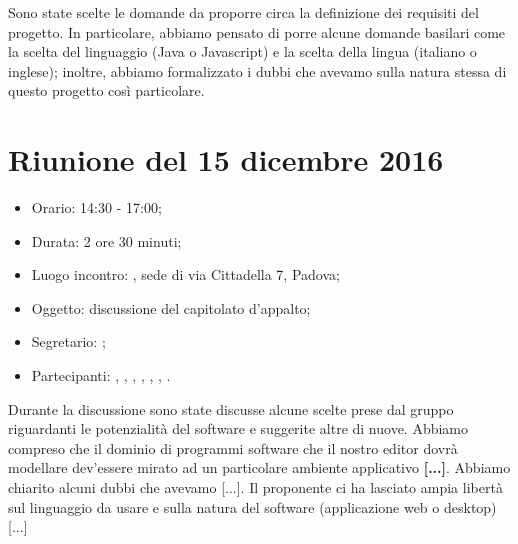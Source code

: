 Sono state scelte le domande da proporre circa la definizione dei requisiti del progetto. In particolare, abbiamo pensato di porre alcune domande basilari come la scelta del linguaggio (Java o Javascript) e la scelta della lingua (italiano o inglese); inoltre, abbiamo formalizzato i dubbi che avevamo sulla natura stessa di questo progetto così particolare.



\section{Riunione del 15 dicembre 2016}

\begin{itemize}
	\item Orario: 14:30 - 17:00;
	\item Durata: 2 ore 30 minuti;
	\item Luogo incontro: \ZU, sede di via Cittadella 7, Padova; 
	\item Oggetto: discussione del capitolato d'appalto;
	\item Segretario: \LS; 
	\item Partecipanti: \GP, \AZ, \GG, \LB, \LS, \MM, \PB.
\end{itemize}

Durante la discussione sono state discusse alcune scelte prese dal gruppo riguardanti le potenzialità del software e suggerite altre di nuove. Abbiamo compreso che il dominio di programmi software che il nostro editor dovrà modellare dev'essere mirato ad un particolare ambiente applicativo \textbf{[...]}. Abbiamo chiarito alcuni dubbi che avevamo [...]. Il proponente ci ha lasciato ampia libertà sul linguaggio da usare e sulla natura del software (applicazione web o desktop)[...]


